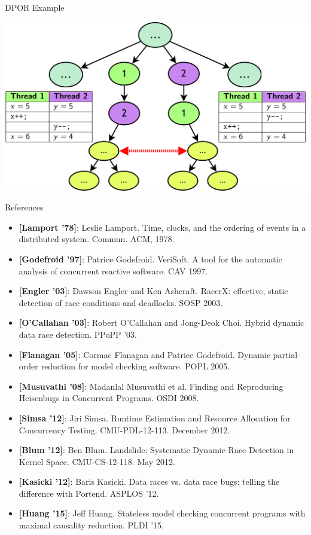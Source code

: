 \documentclass[xcolor=dvipsnames]{beamer}
\begin{document}
\begin{frame}{DPOR Example}
	\begin{center}
		\includegraphics[width=\textwidth]{undiamond1.png}
	\end{center}
\end{frame}

\begin{frame}{References}
	\scriptsize
	\begin{itemize}
		\item {\bf [Lamport '78]}: 
			Leslie Lamport. Time, clocks, and the ordering of events in a distributed system.
			Commun. ACM, 1978.
		\item {\bf [Godefroid '97]}: Patrice Godefroid.
			VeriSoft. A tool for the automatic analysis of concurrent reactive software. CAV 1997.
		\item {\bf [Engler '03]}: Dawson Engler and Ken Ashcraft. 
			RacerX: effective, static detection of race conditions and deadlocks. SOSP 2003.
		\item {\bf [O'Callahan '03]}: Robert O'Callahan and Jong-Deok Choi.
			Hybrid dynamic data race detection. PPoPP '03.
		\item {\bf [Flanagan '05]}: Cormac Flanagan and Patrice Godefroid. Dynamic partial-order reduction for
			model checking software. POPL 2005.
		\item {\bf [Musuvathi '08]}: Madanlal Musuvathi et al. Finding and Reproducing Heisenbugs in Concurrent
			Programs. OSDI 2008.
		\item {\bf [Simsa '12]}: Jiri Simsa. Runtime Estimation and Resource Allocation for
			Concurrency Testing. CMU-PDL-12-113. December 2012.
		\item {\bf [Blum '12]}: Ben Blum. Landslide: Systematic Dynamic Race Detection in Kernel
			Space. CMU-CS-12-118. May 2012.
		\item {\bf [Kasicki '12]}: Baris Kasicki. Data races vs. data race bugs: telling the difference with Portend. ASPLOS '12.
		\item {\bf [Huang '15]}: Jeff Huang. Stateless model checking concurrent programs with maximal causality reduction. PLDI '15.

	\end{itemize}
\end{frame}
\end{document}
